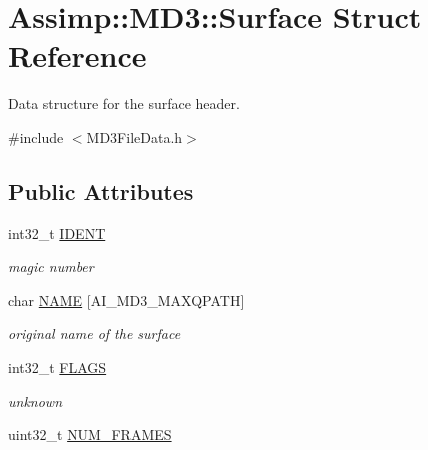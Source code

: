 \hypertarget{struct_assimp_1_1_m_d3_1_1_surface}{\section{Assimp\+:\+:M\+D3\+:\+:Surface Struct Reference}
\label{struct_assimp_1_1_m_d3_1_1_surface}
}


Data structure for the surface header.  




{\ttfamily \#include $<$M\+D3\+File\+Data.\+h$>$}

\subsection*{Public Attributes}
\begin{DoxyCompactItemize}
\item 
\hypertarget{struct_assimp_1_1_m_d3_1_1_surface_ac888d9ad9f6896707efb63f2a193d36c}{int32\+\_\+t \hyperlink{struct_assimp_1_1_m_d3_1_1_surface_ac888d9ad9f6896707efb63f2a193d36c}{I\+D\+E\+N\+T}}\label{struct_assimp_1_1_m_d3_1_1_surface_ac888d9ad9f6896707efb63f2a193d36c}

\begin{DoxyCompactList}\small\item\em magic number \end{DoxyCompactList}\item 
\hypertarget{struct_assimp_1_1_m_d3_1_1_surface_a545ebf106710f9f93478bb54ea1bb1b7}{char \hyperlink{struct_assimp_1_1_m_d3_1_1_surface_a545ebf106710f9f93478bb54ea1bb1b7}{N\+A\+M\+E} \mbox{[}A\+I\+\_\+\+M\+D3\+\_\+\+M\+A\+X\+Q\+P\+A\+T\+H\mbox{]}}\label{struct_assimp_1_1_m_d3_1_1_surface_a545ebf106710f9f93478bb54ea1bb1b7}

\begin{DoxyCompactList}\small\item\em original name of the surface \end{DoxyCompactList}\item 
\hypertarget{struct_assimp_1_1_m_d3_1_1_surface_a7ef195979da21fafedede1c9d4d92a05}{int32\+\_\+t \hyperlink{struct_assimp_1_1_m_d3_1_1_surface_a7ef195979da21fafedede1c9d4d92a05}{F\+L\+A\+G\+S}}\label{struct_assimp_1_1_m_d3_1_1_surface_a7ef195979da21fafedede1c9d4d92a05}

\begin{DoxyCompactList}\small\item\em unknown \end{DoxyCompactList}\item 
\hypertarget{struct_assimp_1_1_m_d3_1_1_surface_a77281ef592cb71905860924b61127144}{uint32\+\_\+t \hyperlink{struct_assimp_1_1_m_d3_1_1_surface_a77281ef592cb71905860924b61127144}{N\+U\+M\+\_\+\+F\+R\+A\+M\+E\+S}}\label{struct_assimp_1_1_m_d3_1_1_surface_a77281ef592cb71905860924b61127144}


\end{DoxyCompactItemize}
